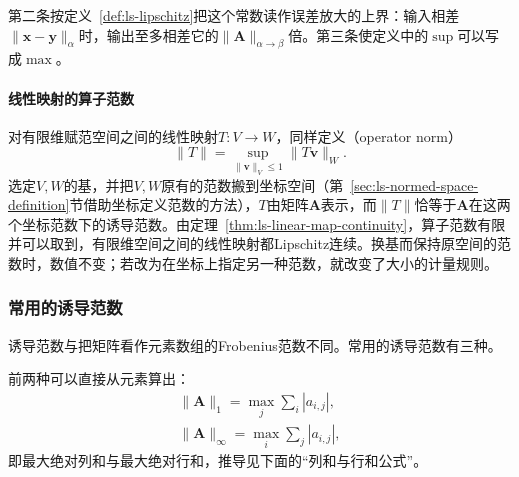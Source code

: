 第二条按定义~\ref{def:ls-lipschitz}把这个常数读作误差放大的上界：输入相差$\lVert\bm x-\bm y\rVert_\alpha$时，输出至多相差它的$\lVert\bm A\rVert_{\alpha\to\beta}$倍。第三条使定义中的$\sup$可以写成$\max$。

\paragraph{线性映射的算子范数}
对有限维赋范空间之间的线性映射$T:V\to W$，同样定义（operator norm）
\begin{equation}
 \lVert T\rVert=\sup_{\lVert\bm v\rVert_V\leq1}\lVert T\bm v\rVert_W .
 \label{eq:ls-operator-norm}
\end{equation}
选定$V,W$的基，并把$V,W$原有的范数搬到坐标空间（第~\ref{sec:ls-normed-space-definition}节借助坐标定义范数的方法），$T$由矩阵$\bm A$表示，而$\lVert T\rVert$恰等于$\bm A$在这两个坐标范数下的诱导范数。由定理~\ref{thm:ls-linear-map-continuity}，算子范数有限并可以取到，有限维空间之间的线性映射都Lipschitz连续。换基而保持原空间的范数时，数值不变；若改为在坐标上指定另一种范数，就改变了大小的计量规则。

\subsubsection{常用的诱导范数}
\label{sec:ls-common-induced-norms}

诱导范数与把矩阵看作元素数组的Frobenius范数不同。常用的诱导范数有三种。

前两种可以直接从元素算出：
\begin{equation}
 \begin{gathered}
 \lVert\bm A\rVert_1=\max_j\sum_i|a_{i,j}|,\\
 \lVert\bm A\rVert_\infty=\max_i\sum_j|a_{i,j}|,
 \end{gathered}
 \label{eq:ls-induced-norm-column-row-sums}
\end{equation}
即最大绝对列和与最大绝对行和，推导见下面的“列和与行和公式”。

